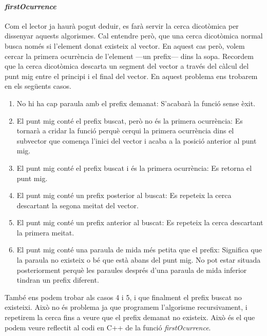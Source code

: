 \documentclass[titlepage]{article}
\begin{document}
\paragraph{\textit{firstOcurrence}} Com el lector ja haurà pogut deduir, es farà servir la cerca dicotòmica per dissenyar aquests algorismes. Cal entendre però, que una cerca dicotòmica normal busca només si l'element donat existeix al vector. En aquest cas però, volem cercar la primera ocurrència de l'element —un prefix— dins la sopa.
Recordem que la cerca dicotòmica descarta un segment del vector a través del càlcul del punt mig entre el  principi i el final del vector. En aquest problema ens trobarem en els següents casos.
\begin{enumerate}
  \item No hi ha cap paraula amb el prefix demanat: S'acabarà la funció sense èxit.
  \item El punt mig conté el prefix buscat, però no és la primera ocurrència: Es tornarà a cridar la funció perquè cerqui la primera ocurrència dins el subvector que comença l'inici del vector i acaba a la posició anterior al punt mig.
  \item El punt mig conté el prefix buscat i és la primera ocurrència: Es retorna el punt mig.
  \item El punt mig conté un prefix posterior al buscat: Es repeteix la cerca descartant la segona meitat del vector.
  \item El punt mig conté un prefix anterior al buscat: Es repeteix la cerca descartant la primera  meitat.
  \item El punt mig conté una paraula de mida més petita que el prefix: Significa que la paraula no existeix o bé que està abans del punt mig. No pot estar situada posteriorment perquè les paraules després d'una paraula de mida inferior tindran un prefix diferent.
\end{enumerate}
També ens podem trobar als casos 4 i 5, i que finalment el prefix buscat no existeixi. Això no és problema ja que programem l'algorisme recursivament, i repetirem la cerca fins a veure que el prefix demanat no existeix. Això és el que podem veure reflectit al codi en C++ de la funció \textit{firstOcurrence}.\newline
\end{document}
